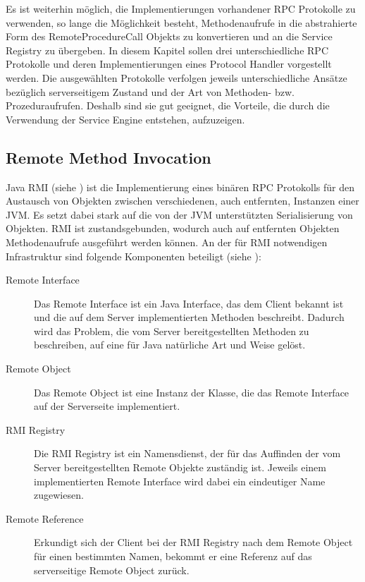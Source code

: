 Es ist weiterhin möglich, die Implementierungen vorhandener \ac{RPC} Protokolle
zu verwenden, so lange die Möglichkeit besteht, Methodenaufrufe in die
abstrahierte Form des RemoteProcedureCall Objekts zu konvertieren und an die Service Registry
zu übergeben. In diesem Kapitel sollen drei unterschiedliche \ac{RPC} Protokolle
und deren Implementierungen eines Protocol Handler vorgestellt werden. Die
ausgewählten Protokolle verfolgen jeweils unterschiedliche Ansätze bezüglich
serverseitigem Zustand und der Art von Methoden- bzw. Prozeduraufrufen. Deshalb
sind sie gut geeignet, die Vorteile, die durch die Verwendung der Service Engine
entstehen, aufzuzeigen.

\subsection{Remote Method Invocation}\label{subsec:rmi}
Java \ac{RMI} (siehe \cite{sun:rmi}) ist die Implementierung eines binären
\ac{RPC} Protokolls für den Austausch von Objekten zwischen verschiedenen, auch
entfernten, Instanzen einer \ac{JVM}. Es setzt dabei stark auf die von der
\ac{JVM} unterstützten Serialisierung von Objekten. \ac{RMI} ist
zustandsgebunden, wodurch auch auf entfernten Objekten Methodenaufrufe
ausgeführt werden können. An der für \ac{RMI} notwendigen Infrastruktur sind
folgende Komponenten beteiligt (siehe \cite{wiki:rmi}):

\begin{description}
\item[Remote Interface] Das Remote Interface ist ein Java Interface, das dem
Client bekannt ist und die auf dem Server implementierten Methoden beschreibt.
Dadurch wird das Problem, die vom Server bereitgestellten Methoden zu
beschreiben, auf eine für Java natürliche Art und Weise gelöst.
\item[Remote Object] Das Remote Object ist eine Instanz der Klasse, die das
Remote Interface auf der Serverseite implementiert.
\item[RMI Registry] Die \ac{RMI} Registry ist ein Namensdienst, der für das
Auffinden der vom Server bereitgestellten Remote Objekte zuständig ist. Jeweils
einem implementierten Remote Interface wird dabei ein eindeutiger Name
zugewiesen.
\item[Remote Reference] Erkundigt sich der Client bei der \ac{RMI} Registry nach
dem Remote Object für einen bestimmten Namen, bekommt er eine Referenz auf das
serverseitige Remote Object zurück.
\end{description}


